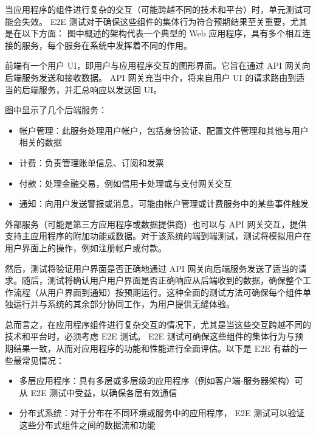 

当应用程序的组件进行复杂的交互（可能跨越不同的技术和平台）时，单元测试可能会失效。 E2E 测试对于确保这些组件的集体行为符合预期结果至关重要，尤其是在以下方面： 图中概述的架构代表一个典型的 Web 应用程序，具有多个相互连接的服务，每个服务在系统中发挥着不同的作用。


前端有一个用户 UI，即用户与应用程序交互的图形界面。它旨在通过 API 网关向后端服务发送和接收数据。 API 网关充当中介，将来自用户 UI 的请求路由到适当的后端服务，并汇总响应以发送回 UI。

图中显示了几个后端服务：

\begin{itemize}
\item
帐户管理：此服务处理用户帐户，包括身份验证、配置文件管理和其他与用户相关的数据

\item
计费：负责管理账单信息、订阅和发票

\item
付款：处理金融交易，例如信用卡处理或与支付网关交互

\item
通知：向用户发送警报或消息，可能由帐户管理或计费服务中的某些事件触发
\end{itemize}

外部服务（可能是第三方应用程序或数据提供商）也可以与 API 网关交互，提供支持主应用程序的附加功能或数据。对于该系统的端到端测试，测试将模拟用户在用户界面上的操作，例如注册帐户或付款。

然后，测试将验证用户界面是否正确地通过 API 网关向后端服务发送了适当的请求。随后，测试将确认用户用户界面是否正确响应从后端收到的数据，确保整个工作流程（从用户界面到通知）按预期运行。这种全面的测试方法可确保每个组件单独运行并与系统的其余部分协同工作，为用户提供无缝体验。

总而言之，在应用程序组件进行复杂交互的情况下，尤其是当这些交互跨越不同的技术和平台时，必须考虑 E2E 测试。 E2E 测试可确保这些组件的集体行为与预期结果一致，从而对应用程序的功能和性能进行全面评估。以下是 E2E 有益的一些最常见情况：

\begin{itemize}
\item
多层应用程序：具有多层或多层级的应用程序（例如客户端-服务器架构）可从 E2E 测试中受益，以确保各层有效通信

\item
分布式系统：对于分布在不同环境或服务中的应用程序， E2E 测试可以验证这些分布式组件之间的数据流和功能
\end{itemize}

